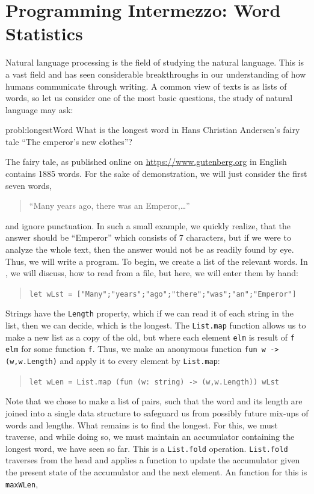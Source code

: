 \documentclass[fsharpNotes.tex]{subfiles}
\begin{document}
\section{Programming Intermezzo: Word Statistics}
Natural language processing is the field of studying the natural language. This is a vast field and has seen considerable breakthroughs in our understanding of how humans communicate through writing. A common view of texts is as lists of words, so let us consider one of the most basic questions, the study of natural language may ask:
%
\begin{task}{probl:longestWord}
  What is the longest word in Hans Christian Andersen's fairy tale ``The emperor's new clothes''?
\end{task}
%
The fairy tale, as published online on \url{https://www.gutenberg.org} in English contains 1885 words. For the sake of demonstration, we will just consider the first seven words,
\begin{quote}
  ``Many years ago, there was an Emperor,\dots''
\end{quote}
and ignore punctuation. In such a small example, we quickly realize, that the answer should be ``Emperor'' which consists of 7 characters, but if we were to analyze the whole text, then the answer would not be as readily found by eye. Thus, we will write a program. To begin, we create a list of the relevant words. In , we will discuss, how to read from a file, but here, we will enter them by hand:
\begin{quote}
  \lstinline{let wLst = ["Many";"years";"ago";"there";"was";"an";"Emperor"]}
\end{quote}
Strings have the \lstinline{Length} property, which if we can read it of each string in the list, then we can decide, which is the longest. The \lstinline{List.map} function allows us to make a new list as a copy of the old, but where each element \lstinline{elm} is result of \lstinline{f elm} for some function \lstinline{f}. Thus, we make an anonymous function \lstinline{fun w -> (w,w.Length)} and apply it to every element by \lstinline{List.map}:
\begin{quote}
  \lstinline{let wLen = List.map (fun (w: string) -> (w,w.Length)) wLst}
\end{quote}
Note that we chose to make a list of pairs, such that the word and its length are joined into a single data structure to safeguard us from possibly future mix-ups of words and lengths. What remains is to find the longest. For this, we must traverse, and while doing so, we must maintain an accumulator containing the longest word, we have seen so far. This is a \lstinline{List.fold} operation. \lstinline{List.fold} traverses from the head and applies a function to update the accumulator given the present state of the accumulator and the next element. An function for this is \lstinline{maxWLen},
\end{document}
